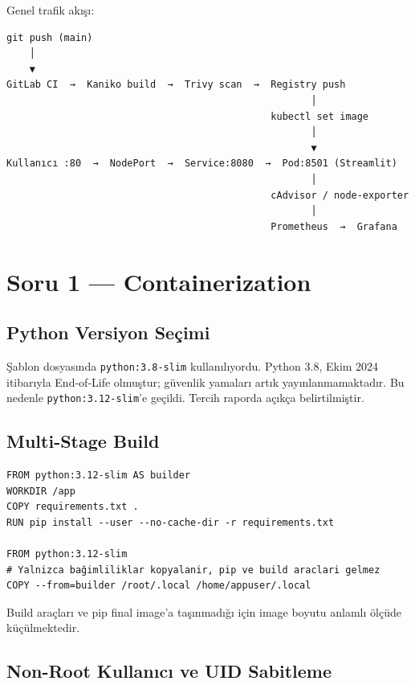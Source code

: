 \documentclass[12pt,a4paper]{article}
\begin{document}
Genel trafik akışı:

\begin{lstlisting}
git push (main)
    │
    ▼
GitLab CI  →  Kaniko build  →  Trivy scan  →  Registry push
                                                     │
                                              kubectl set image
                                                     │
                                                     ▼
Kullanıcı :80  →  NodePort  →  Service:8080  →  Pod:8501 (Streamlit)
                                                     │
                                              cAdvisor / node-exporter
                                                     │
                                              Prometheus  →  Grafana
\end{lstlisting}

\section{Soru 1 — Containerization}

\subsection{Python Versiyon Seçimi}

Şablon dosyasında \texttt{python:3.8-slim} kullanılıyordu. Python 3.8,
Ekim 2024 itibarıyla End-of-Life olmuştur; güvenlik yamaları artık
yayınlanmamaktadır. Bu nedenle \texttt{python:3.12-slim}'e geçildi.
Tercih raporda açıkça belirtilmiştir.

\subsection{Multi-Stage Build}

\begin{lstlisting}[language=docker,caption={Multi-stage build yapısı}]
FROM python:3.12-slim AS builder
WORKDIR /app
COPY requirements.txt .
RUN pip install --user --no-cache-dir -r requirements.txt

FROM python:3.12-slim
# Yalnizca bağimliliklar kopyalanir, pip ve build araclari gelmez
COPY --from=builder /root/.local /home/appuser/.local
\end{lstlisting}

Build araçları ve pip final image'a taşınmadığı için image boyutu
anlamlı ölçüde küçülmektedir.

\subsection{Non-Root Kullanıcı ve UID Sabitleme}
\end{document}
